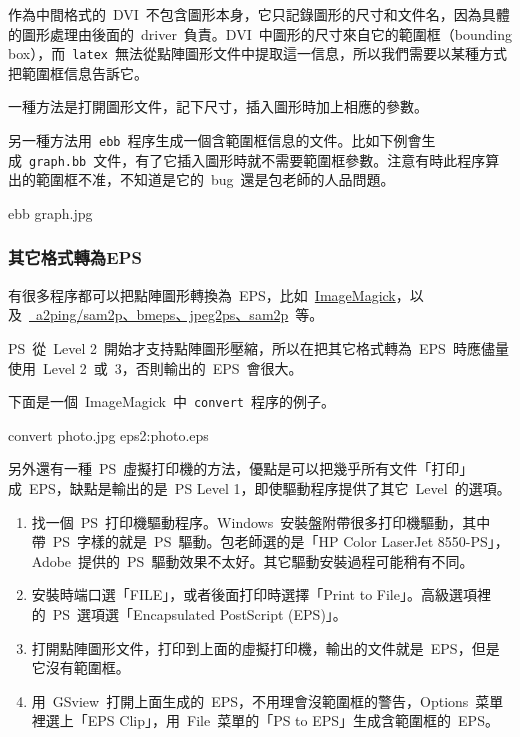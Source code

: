 作為中間格式的~DVI~不包含圖形本身，它只記錄圖形的尺寸和文件名，因為具體的圖形處理由後面的~driver~負責。DVI~中圖形的尺寸來自它的範圍框（bounding box），而~\verb|latex|~無法從點陣圖形文件中提取這一信息，所以我們需要以某種方式把範圍框信息告訴它。

一種方法是打開圖形文件，記下尺寸，插入圖形時加上相應的參數。

另一種方法用~\verb|ebb|~程序生成一個含範圍框信息的文件。比如下例會生成~\verb|graph.bb|~文件，有了它插入圖形時就不需要範圍框參數。注意有時此程序算出的範圍框不准，不知道是它的~bug~還是包老師的人品問題。
\begin{code}
ebb graph.jpg
\end{code}

\subsubsection{其它格式轉為EPS}
有很多程序都可以把點陣圖形轉換為~EPS，比如~\href{http://www.imagemagick.org/}{ImageMagick}，以及~\href{http://www.tex.ac.uk/cgi-bin/texfaq2html?label=dvipsgraphics}{~a2ping/sam2p、bmeps、jpeg2ps、sam2p}~等。

PS~從~Level 2~開始才支持點陣圖形壓縮，所以在把其它格式轉為~EPS~時應儘量使用~Level 2~或~3，否則輸出的~EPS~會很大。

下面是一個~ImageMagick~中~\verb|convert|~程序的例子。
\begin{code}
convert photo.jpg eps2:photo.eps
\end{code}

另外還有一種~PS~虛擬打印機的方法，優點是可以把幾乎所有文件「打印」成~EPS，缺點是輸出的是~PS Level 1，即使驅動程序提供了其它~Level~的選項。

\begin{enumerate}
\item 找一個~PS~打印機驅動程序。Windows~安裝盤附帶很多打印機驅動，其中帶~PS~字樣的就是~PS~驅動。包老師選的是「HP Color LaserJet 8550-PS」，Adobe~提供的~PS~驅動效果不太好。其它驅動安裝過程可能稍有不同。
\item 安裝時端口選「FILE」，或者後面打印時選擇「Print to File」。高級選項裡的~PS~選項選「Encapsulated PostScript (EPS)」。
\item 打開點陣圖形文件，打印到上面的虛擬打印機，輸出的文件就是~EPS，但是它沒有範圍框。
\item 用~GSview~打開上面生成的~EPS，不用理會沒範圍框的警告，Options~菜單裡選上「EPS Clip」，用~File~菜單的「PS to EPS」生成含範圍框的~EPS。
\end{enumerate}

